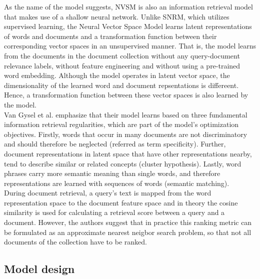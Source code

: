As the name of the model suggests, NVSM is also an information
    retrieval model that makes use of a shallow neural network.
Unlike SNRM, which utilizes supervised learning, the 
    Neural Vector Space Model learns latent representations
    of words and documents and a
    transformation function between their corresponding 
    vector spaces
    in an unsupervised manner.
That is, the model learns from the documents in the document 
    collection without any query-document relevance labels, 
    without feature engineering and
    without using a pre-trained word embedding.
Although the model operates in latent vector space,
    the dimensionality of the learned word and document
    repsentations is differeent.
Hence, a transformation function between these vector spaces
    is also learned by the model.\\
Van Gysel et al. emphasize that their model learns based on
    three fundamental information retrieval regularities, 
    which are part of the model's optimization objectives.
Firstly, words that occur in many documents are not discriminatory
    and should therefore be neglected (referred as term specificity).
Further, document representations in latent space that have 
    other representations nearby, tend to describe
    similar or related concepts (cluster hypothesis).
Lastly, word phrases carry more semantic
    meaning than single words, and therefore representations
    are learned with sequences of words (semantic matching).\\
During document retrieval, a query's text is mapped
    from the word representation space to the document feature
    space and in theory the cosine similarity is used 
    for calculating a retrieval score between a query and
    a document.
However, the authors suggest that in practice this ranking 
    metric can be formulated as an approximate nearest neigbor 
    search problem, so that not all documents of the collection
    have to be ranked. \cite{van-gysel:2017:neural-vector-spaces}

\subsection*{Model design}

